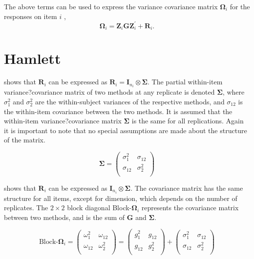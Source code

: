 \documentclass[12pt, a4paper]{report}
\theoremstyle{plain}
\theoremstyle{definition}
\theoremstyle{remark}
\begin{document}
\bigskip
The above terms can be used to express the  variance covariance matrix $\boldsymbol{\Omega}_i$ for the responses on item $i$ ,
\[
\boldsymbol{\Omega}_i = \boldsymbol{Z}_i \boldsymbol{G} \boldsymbol{Z}_i^{\prime} + \boldsymbol{R}_i.
\]

\section{Hamlett}
\citet{hamlett} shows that $\boldsymbol{R}_{i}$  can be expressed as $\boldsymbol{R}_{i} = \boldsymbol{I}_{n_{i}} \otimes \boldsymbol{\Sigma}$. The partial within-item variance?covariance matrix of two methods at any replicate is denoted $\boldsymbol{\Sigma}$, where $\sigma^2_{1}$ and $\sigma^2_{2}$ are the within-subject variances of the respective methods, and $\sigma_{12}$ is the within-item covariance between the two methods. It is assumed that the within-item variance?covariance matrix $\boldsymbol{\Sigma}$ is the same for all replications. Again it is important to note that no special assumptions are made about the structure of the matrix.

\begin{equation}
\boldsymbol{\Sigma} = \left( \begin{array}{cc}
\sigma^2_{1} & \sigma_{12} \\
\sigma_{12} & \sigma^2_{2} \\
\end{array}\right)
\end{equation}

\citet{hamlett} shows that $\boldsymbol{R}_{i}$  can be expressed as $\boldsymbol{I}_{n_{i}} \otimes \boldsymbol{\Sigma}$. The covariance matrix has the same structure for all items, except for dimension, which depends on the number of replicates. The $2 \times 2$ block diagonal Block-$\boldsymbol{\Omega}_{i}$ represents the covariance matrix between two methods, and is the sum of $\boldsymbol{G}$ and $\boldsymbol{\Sigma}$.

\[ \textrm{Block-}\boldsymbol{\Omega}_{i}  = \left(\begin{array}{cc}
\omega^2_1  & \omega_{12} \\
\omega_{12} & \omega^2_2 \\
\end{array}  \right)
=  \left(
\begin{array}{cc}
g^2_1  & g_{12} \\
g_{12} & g^2_2 \\
\end{array} \right)+
\left(
\begin{array}{cc}
\sigma^2_1  & \sigma_{12} \\
\sigma_{12} & \sigma^2_2 \\
\end{array}\right)
\]
\end{document}
